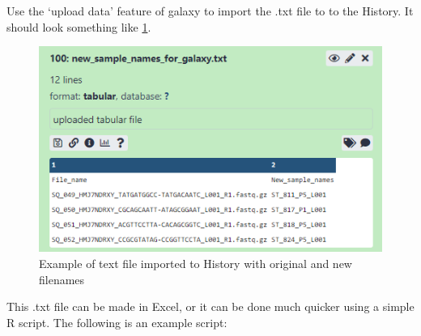 \documentclass[
]{book}
\begin{document}
Use the `upload data' feature of galaxy to import the .txt file to to the History. It should look something like \ref{fig:example-rename}.

\begin{figure}

{\centering \includegraphics[width=1\linewidth]{images/image009} 

}

\caption{Example of text file imported to History with original and new filenames}\label{fig:example-rename}
\end{figure}

This .txt file can be made in Excel, or it can be done much quicker using a simple R script. The following is an example script:
\end{document}
